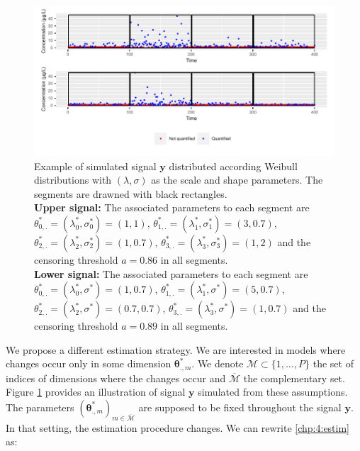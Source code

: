 \begin{figure}[ht]
    \centering
    \includegraphics{figs/Chap4/param_ex.pdf}
    \caption{Example of simulated signal $\bm y$ distributed according Weibull distributions with $(\lambda,\sigma)$ as the scale and shape parameters. The segments are drawned with black rectangles. \\ 
\textbf{Upper signal:} The associated parameters to each segment are $\theta^*_{0,.} = (\lambda^*_0,\sigma^*_0) = (1,1)$, $\theta^*_{1,.} = (\lambda^*_1,\sigma^*_1) = (3,0.7)$, $\theta^*_{2,.} = (\lambda^*_2,\sigma^*_2) = (1,0.7)$, $\theta^*_{3,.} = (\lambda^*_3,\sigma^*_3) = (1,2)$ and the censoring threshold $a = 0.86$ in all segments.\\
\textbf{Lower signal:} The associated parameters to each segment are $\theta^*_{0,.} = (\lambda^*_0,\sigma^*) = (1,0.7)$, $\theta^*_{1,.} = (\lambda^*_1,\sigma^*) = (5,0.7)$, $\theta^*_{2,.} = (\lambda^*_2,\sigma^*) = (0.7,0.7)$, $\theta^*_{3,.} = (\lambda^*_3,\sigma^*) = (1,0.7)$ and the censoring threshold $a = 0.89$ in all segments.}
    \label{fig:param_ex}
\end{figure}

We propose a different estimation strategy. We are interested in models where changes occur only in some dimension $\bm\theta^*_{.,m}$. We denote $\mathcal{M} \subset \{1,\dots,P\}$ the set of indices of dimensions where the changes occur and $\overline{\mathcal{M}}$ the complementary set. Figure \ref{fig:param_ex} provides an illustration of signal $\bm y$ simulated from these assumptions. The parameters $(\bm\theta^*_{.,m})_{m \in \overline{\mathcal{M}}}$ are supposed to be fixed throughout the signal $\bm y$. In that setting, the estimation procedure changes. We can rewrite \ref{chp:4:estim} as: 
    
